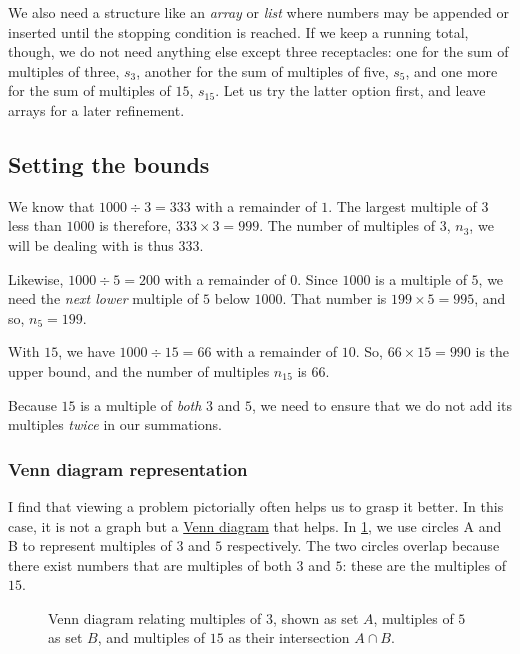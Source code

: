 \documentclass[
  a4paper,
]{article}
\begin{document}
We also need a structure like an \emph{array} or \emph{list} where
numbers may be appended or inserted until the stopping condition is
reached. If we keep a running total, though, we do not need anything
else except three receptacles: one for the sum of multiples of three,
\(s_3\), another for the sum of multiples of five, \(s_5\), and one more
for the sum of multiples of \(15\), \(s_{15}\). Let us try the latter
option first, and leave arrays for a later refinement.

\hypertarget{setting-the-bounds}{%
\subsection{Setting the bounds}\label{setting-the-bounds}}

We know that \(1000 \div 3 = 333\) with a remainder of \(1\). The
largest multiple of \(3\) less than \(1000\) is therefore,
\(333 \times 3 = 999\). The number of multiples of \(3\), \(n_{3}\), we
will be dealing with is thus \(333\).

Likewise, \(1000 \div 5 = 200\) with a remainder of \(0\). Since
\(1000\) is a multiple of \(5\), we need the \emph{next lower} multiple
of \(5\) below \(1000\). That number is \(199 \times 5 = 995\), and so,
\(n_{5} = 199\).

With \(15\), we have \(1000 \div 15 = 66\) with a remainder of \(10\).
So, \(66 \times 15 = 990\) is the upper bound, and the number of
multiples \(n_{15}\) is \(66\).

Because \(15\) is a multiple of \emph{both} \(3\) and \(5\), we need to
ensure that we do not add its multiples \emph{twice} in our summations.

\hypertarget{venn-diagram-representation}{%
\subsubsection{Venn diagram
representation}\label{venn-diagram-representation}}

I find that viewing a problem pictorially often helps us to grasp it
better. In this case, it is not a graph but a
\href{https://www.lucidchart.com/pages/tutorial/venn-diagram}{Venn
diagram} that helps. In \cref{fig:venn}, we use circles A and B to
represent multiples of \(3\) and \(5\) respectively. The two circles
overlap because there exist numbers that are multiples of both \(3\) and
\(5\): these are the multiples of \(15\).

\begin{figure}
\hypertarget{fig:venn}{%
\centering

\caption{Venn diagram relating multiples of \(3\), shown as set \(A\),
multiples of \(5\) as set \(B\), and multiples of \(15\) as their
intersection \(A\cap B\).}\label{fig:venn}
}
\end{figure}
\end{document}
